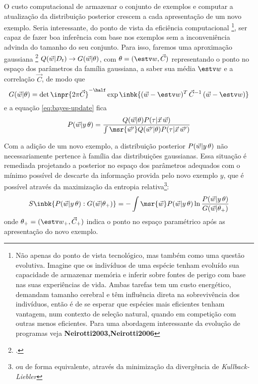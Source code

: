 \newcommand{\Ct}{\ensuremath{\vec{C}}}
\newcommand{\CT}{\ensuremath{\Ct_+}}
\newcommand{\At}{\ensuremath{\theta}}
\newcommand{\AT}{\ensuremath{\At_+}}
O custo computacional de armazenar o conjunto de exemplos e computar a
atualização da distribuição posterior crescem a cada apresentação de um novo
exemplo. Seria interessante, do ponto de vista da eficiência computacional
\footnote[][-4cm]{Não apenas do ponto de vista tecnológico, mas também como uma
  questão evolutiva. Imagine que os indivíduos de uma espécie tenham evoluído
  sua capacidade de armazenar memória e inferir sobre fontes de perigo com base
  nas suas experiências de vida. Ambas tarefas tem um custo energético, demandam
  tamanho cerebral e têm influência direta na sobrevivência dos indivíduos,
  então é de se esperar que espécies mais eficientes tenham vantagem, num
  contexto de seleção natural, quando em competição com outras menos
  eficientes. Para uma abordagem interessante da evolução de programas veja
  \bf{Neirotti2003,Neirotti2006}}, ser capaz de fazer boa inferência com base nos
exemplos sem a inconveniência advinda do tamanho do seu conjunto. Para isso,
faremos uma aproximação gaussiana \footcite{Solla1999,Opper1996} $Q(\rl|\Dt) \to
G(\rl|\At)$, com $\At = (\wt,\Ct)$ representando o ponto no espaço dos
parâmetros da família gaussiana, a saber sua média $\wt$ e a correlação $\Ct$,
de modo que
\[
  G(\rl|\At) = \det \inpr{{2\pi \Ct}} ^ {-\half}
            \exp \inbk{{(\rl-\wt)^T \,\Ct ^ {-1}\,(\rl-\wt)}}
\]
e a equação \eqref{eq:bayes-update} fica
\begin{equation}\label{eq:bayes-up-approx}
    P(\rl|y\,\At) = \frac{Q(\rl|\At)P(\tau|\vec{x}\,\rl)}
             {\int \msr{\rl'} Q(\rl'|\At)P(\tau|\vec{x}\,\rl')}
\end{equation}

Com a adição de um novo exemplo, a distribuição posterior $P(\rl|y\,\At)$ não
necessariamente pertence à família das distribuições gaussianas.  Essa situação
é remediada projetando a posterior no espaço dos parâmetros adequados com o
mínimo possível de descarte da informação provida pelo novo exemplo $y$, que é
possível através da maximização da entropia relativa\footnote{ou de forma
  equivalente, através da minimização da divergência de
  \emph{Kullback-Liebler}}:
\begin{equation}
  \label{eq:entropy}
  S \inbk{P(\rl|y\,\At):G(\rl|\AT)} =
        -\int \msr{\rl} P(\rl|y\,\At) \ln \frac{P(\rl|y\,\At)}
                                               {G(\rl|\AT)}
\end{equation}
onde $\AT = (\wT,\CT)$ indica o ponto no espaço paramétrico após as apresentação do novo exemplo.

